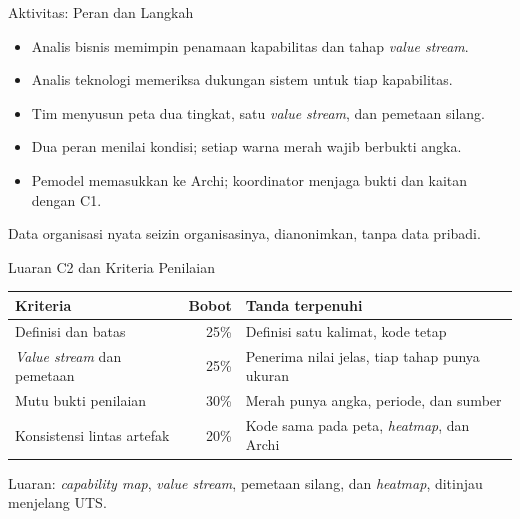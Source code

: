 \documentclass[aspectratio=169, table, 12pt]{beamer}
\begin{document}
\begin{frame}{{\Large Aktivitas: Peran dan Langkah}}
  \vspace{6pt}
  \begin{itemize}
    \item Analis bisnis memimpin penamaan kapabilitas dan tahap \textit{value stream}.
    \item Analis teknologi memeriksa dukungan sistem untuk tiap kapabilitas.
    \item Tim menyusun peta dua tingkat, satu \textit{value stream}, dan pemetaan silang.
    \item Dua peran menilai kondisi; setiap warna merah wajib berbukti angka.
    \item Pemodel memasukkan ke Archi; koordinator menjaga bukti dan kaitan dengan C1.
  \end{itemize}
  \vspace{4pt}
  {\small Data organisasi nyata seizin organisasinya, dianonimkan, tanpa data pribadi.}
\end{frame}

\begin{frame}{{\Large Luaran C2 dan Kriteria Penilaian}}
  \footnotesize
  \begin{tabularx}{\textwidth}{>{\raggedright\arraybackslash}p{4.4cm} r
      >{\raggedright\arraybackslash}X}
    \hline
    \textbf{Kriteria} & \textbf{Bobot} & \textbf{Tanda terpenuhi} \\
    \hline
    Definisi dan batas & 25\% & Definisi satu kalimat, kode tetap \\
    \hline
    \textit{Value stream} dan pemetaan & 25\% & Penerima nilai jelas, tiap tahap punya ukuran \\
    \hline
    Mutu bukti penilaian & 30\% & Merah punya angka, periode, dan sumber \\
    \hline
    Konsistensi lintas artefak & 20\% & Kode sama pada peta, \textit{heatmap}, dan Archi \\
    \hline
  \end{tabularx}

  \vspace{8pt}
  \small Luaran: \textit{capability map}, \textit{value stream}, pemetaan silang, dan \textit{heatmap},
  ditinjau menjelang UTS.
\end{frame}
\end{document}
